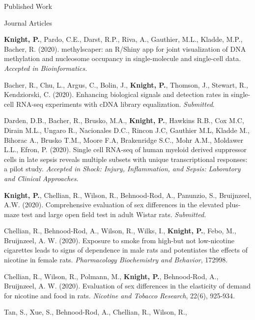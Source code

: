 \documentclass{resume}
\begin{document}
\begin{rSection}{Published Work} %
  \begin{rSubsection}{Journal Articles}{}{}{}
    \item \textbf{Knight, P.}, Pardo, C.E., Darst, R.P., Riva, A.,
      Gauthier, M.L., Kladde, M.P., Bacher, R. (2020). methylscaper:
      an R/Shiny app for joint visualization of DNA methylation and
      nucleosome occupancy in single-molecule and single-cell
      data. \textit{Accepted in Bioinformatics.}
    \item Bacher, R., Chu, L., Argus, C., Bolin, J., \textbf{Knight,
        P.}, Thomson, J., Stewart, R., Kendziorski,
      C. (2020). Enhancing biological signals and detection rates in
      single-cell RNA-seq experiments with cDNA library
      equalization. \textit{Submitted}.
    \item Darden, D.B., Bacher, R., Brusko, M.A., \textbf{Knight, P.}, Hawkins R.B., Cox M.C, Dirain M.L., Ungaro R., Nacionales D.C., Rincon J.C, Gauthier M.L, Kladde M., Bihorac A., Brusko T.M., Moore F.A, Brakenridge S.C., Mohr A.M., Moldawer L.L.,  Efron, P. (2020). Single cell RNA-seq of human myeloid derived suppressor
      cells in late sepsis reveals multiple subsets with unique
      transcriptional responses: a pilot study. \textit{Accepted in
        Shock: Injury, Inflammation, and Sepsis: Laboratory and
        Clinical Approaches}. 
    \item \textbf{Knight, P.}, Chellian, R., Wilson, R., Behnood-Rod,
      A., Panunzio, S., Bruijnzeel, A.W. (2020). Comprehensive evaluation of sex differences in the elevated
      plus-maze test and large open field test in adult Wistar
      rats. \textit{Submitted.}
    \item Chellian, R., Behnood-Rod, A., Wilson, R., Wilks, I.,
      \textbf{Knight, P.}, Febo, M., Bruijnzeel, A. W. (2020). Exposure to
      smoke from high-but not low-nicotine cigarettes leads to signs
      of dependence in male rats and potentiates the effects of
      nicotine in female rats. \textit{Pharmacology Biochemistry and Behavior},
      172998.
    \item Chellian, R., Wilson, R., Polmann, M., \textbf{Knight, P.},
      Behnood-Rod, A., Bruijnzeel, A. W. (2020). Evaluation of sex
      differences in the elasticity of demand for nicotine and food in
      rats. \textit{Nicotine and Tobacco Research}, 22(6), 925-934.
    \item Tan, S., Xue, S., Behnood-Rod, A., Chellian, R., Wilson, R.,

\end{rSubsection}
\end{rSection}
\end{document}
